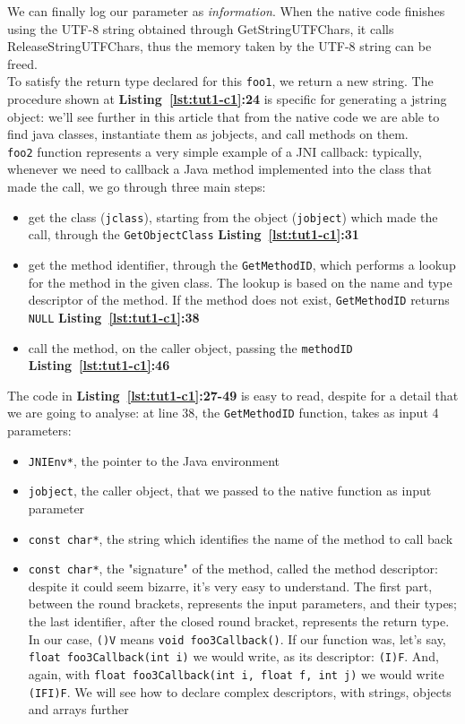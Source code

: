 \documentclass[a4paper,10pt]{article}
\newcommand{\keyword}[1]{\texttt{#1}}
\newcommand{\refl}[1]{\textbf{Listing~\ref{#1}}}
\begin{document}
\begin{multicols}{2}
We can finally log our parameter as \textit{information}. When the native code finishes using the UTF-8 string obtained through GetStringUTFChars, it calls ReleaseStringUTFChars, thus the memory taken by the UTF-8 string can be freed.\\
To satisfy the return type declared for this \keyword{foo1}, we return a new string. The procedure shown at \refl{lst:tut1-c1}\textbf{:24} is specific for generating a jstring object: we'll see further in this article that from the native code we are able to find java classes, instantiate them as jobjects, and call methods on them.\\
\keyword{foo2} function represents a very simple example of a JNI callback: typically, whenever we need to callback a Java method implemented into the class that made the call, we go through three main steps:
\begin{itemize}
\item get the class (\keyword{jclass}), starting from the object (\keyword{jobject}) which made the call, through the \keyword{GetObjectClass} \refl{lst:tut1-c1}\textbf{:31}
\item get the method identifier, through the \keyword{GetMethodID}, which performs a lookup for the method in the given class. The lookup is based on
the name and type descriptor of the method. If the method does not exist, \keyword{GetMethodID} returns \keyword{NULL} \refl{lst:tut1-c1}\textbf{:38}
\item call the method, on the caller object, passing the \keyword{methodID} \refl{lst:tut1-c1}\textbf{:46}
\end{itemize}
The code in \refl{lst:tut1-c1}\textbf{:27-49} is easy to read, despite for a detail that we are going to analyse: at line 38, the \keyword{GetMethodID} function, takes as input 4 parameters:
\begin{itemize}
\item \keyword{JNIEnv*}, the pointer to the Java environment
\item \keyword{jobject}, the caller object, that we passed to the native function as input parameter
\item \keyword{const char*}, the string which identifies the name of the method to call back
\item \keyword{const char*}, the "signature" of the method, called the method descriptor: despite it could seem bizarre, it's very easy to understand. The first part, between the round brackets, represents the input parameters, and their types; the last identifier, after the closed round bracket, represents the return type. In our case, \keyword{()V} means \keyword{void foo3Callback()}. If our function was, let's say, \keyword{float foo3Callback(int i)} we would write, as its descriptor: \keyword{(I)F}. And, again, with \keyword{float foo3Callback(int i, float f, int j)} we would write \keyword{(IFI)F}. We will see how to declare complex descriptors, with strings, objects and arrays further

\end{itemize}
\end{multicols}
\end{document}
